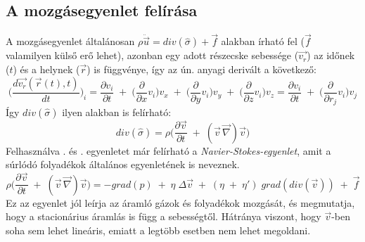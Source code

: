 \documentclass[a4paper, titlepage]{article}
\begin{document}
\subsection*{A mozgásegyenlet felírása}
A mozgásegyenlet általánosan $\rho\ddot{\vec{u}}=div(\hat{\sigma})+\vec{f}$ alakban írható fel ($\vec{f}$ valamilyen külső erő lehet), azonban egy adott részecske sebessége ($\vec{v_r}$) az időnek ($t$) és a helynek ($\vec{r}$) is függvénye, így az ún. anyagi derivált a következő:
\begin{equation}
\bigg(\frac{d\vec{v_r}(\vec{r}(t),t)}{dt}\bigg)_i=\frac{\partial v_i}{\partial t}\;+\;\bigg(\frac{\partial}{\partial x}v_i\bigg)v_x\;+\;\bigg(\frac{\partial}{\partial y}v_i\bigg)v_y\;+\;\bigg(\frac{\partial}{\partial z}v_i\bigg)v_z=\frac{\partial v_i}{\partial t}\;+\;\bigg(\frac{\partial}{\partial r_j}v_i\bigg)v_j
\end{equation}
Így $div(\hat{\sigma})$ ilyen alakban is felírható:
\begin{equation}
\label{equ:anyagi}
div(\hat{\sigma})=\rho\bigg(\frac{\partial \vec{v}}{\partial t}\;+\; (\vec{v}\,\vec{\nabla})\vec{v}\bigg)
\end{equation}
Felhasználva . és . egyenletet már felírható a \textit{Navier-Stokes-egyenlet}, amit a súrlódó folyadékok általános egyenletének is neveznek.
\begin{equation}
\rho\bigg(\frac{\partial \vec{v}}{\partial t}\;+\; (\vec{v}\,\vec{\nabla})\vec{v}\bigg)=-grad(p)\;+\;\eta\;\Delta\vec{v}\; +\; (\eta\; +\; \eta')\;grad(div(\vec{v}))\;+\;\vec{f}
\end{equation}
Ez az egyenlet jól leírja az áramló gázok és folyadékok mozgását, és megmutatja, hogy a stacionárius áramlás is függ a sebességtől. Hátránya viszont, hogy $\vec{v}$-ben soha sem lehet lineáris, emiatt a legtöbb esetben nem lehet megoldani.\\\\
\end{document}

